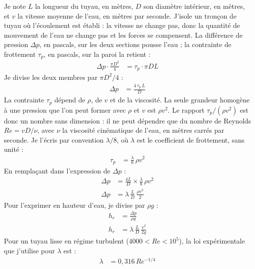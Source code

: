 \begin{demonstration}
Je note $L$ la longueur du tuyau, en mètres, $D$ son diamètre intérieur, en mètres, et $v$ la vitesse moyenne de l'eau, en mètres par seconde. J'isole un tronçon de tuyau où l'écoulement est établi : la vitesse ne change pas, donc la quantité de mouvement de l'eau ne change pas et les forces se compensent. La différence de pression $\Delta p$, en pascals, sur les deux sections pousse l'eau ; la contrainte de frottement $\tau_p$, en pascals, sur la paroi la retient :
\begin{align*}
\Delta p \cdot \frac{\pi D^2}{4} &= \tau_p \cdot \pi D L
\end{align*}
Je divise les deux membres par $\pi D^2/4$ :
\begin{align*}
\Delta p &= \frac{4\,\tau_p\,L}{D}
\end{align*}
La contrainte $\tau_p$ dépend de $\rho$, de $v$ et de la viscosité. La seule grandeur homogène à une pression que l'on peut former avec $\rho$ et $v$ est $\rho v^2$. Le rapport $\tau_p/(\rho v^2)$ est donc un nombre sans dimension : il ne peut dépendre que du nombre de Reynolds $Re = vD/\nu$, avec $\nu$ la viscosité cinématique de l'eau, en mètres carrés par seconde. Je l'écris par convention $\lambda/8$, où $\lambda$ est le coefficient de frottement, sans unité :
\begin{align*}
\tau_p &= \frac{\lambda}{8}\,\rho v^2
\end{align*}
En remplaçant dans l'expression de $\Delta p$ :
\begin{align*}
\Delta p &= \frac{4 L}{D}\times\frac{\lambda}{8}\,\rho v^2\\
\Delta p &= \lambda\,\frac{L}{D}\,\frac{\rho v^2}{2}
\end{align*}
Pour l'exprimer en hauteur d'eau, je divise par $\rho g$ :
\begin{align*}
h_r &= \frac{\Delta p}{\rho g}\\
h_r &= \lambda\,\frac{L}{D}\,\frac{v^2}{2g}
\end{align*}
Pour un tuyau lisse en régime turbulent ($4000 < Re < 10^5$), la loi expérimentale que j'utilise pour $\lambda$ est :
\begin{align*}
\lambda &= 0,316\,Re^{-1/4}
\end{align*}
\end{demonstration}

